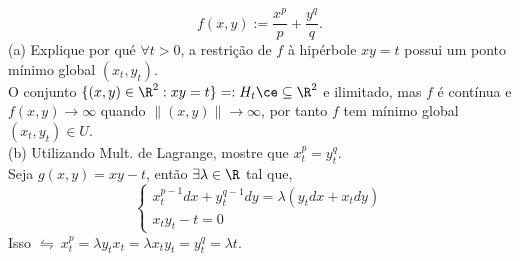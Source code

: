 \[f(x,y) := \frac{x^p}{p} + \frac{y^q}{q}.\] 
(a) Explique por qué \(\forall t>0\), a restrição de \(f\) à hipérbole \(xy = t\) possui um ponto mínimo global \((x_t, y_t)\). \\ 
\textcolor{gris}{O conjunto \(\{(x,y) \in \R^2 : xy=t\}=: H_t\ce\subseteq \R^2 \) e ilimitado, mas \(f\) é contínua e \(f(x,y) \to \infty\) quando \(\|(x,y)\| \to \infty\), por tanto \(f\) tem mínimo global \((x_t, y_t) \in U\). } \\
(b) Utilizando Mult. de Lagrange, mostre que \(x_t^p = y_t^q\). \\ 
\textcolor{gris}{Seja \(g(x,y) = xy - t\), então \(\exists \lambda \in \R \) tal que,  %
\[ \begin{cases}
        x_t^{p-1}dx + y_t^{q-1}dy = \lambda (y_t dx + x_tdy) \\ 
        x_ty_t  - t = 0
    \end{cases}  \]
Isso \(\leftrightharpoons \ x_t^p = \lambda y_tx_t = \lambda x_ty_t = y_t^q = \lambda t  \).
}

